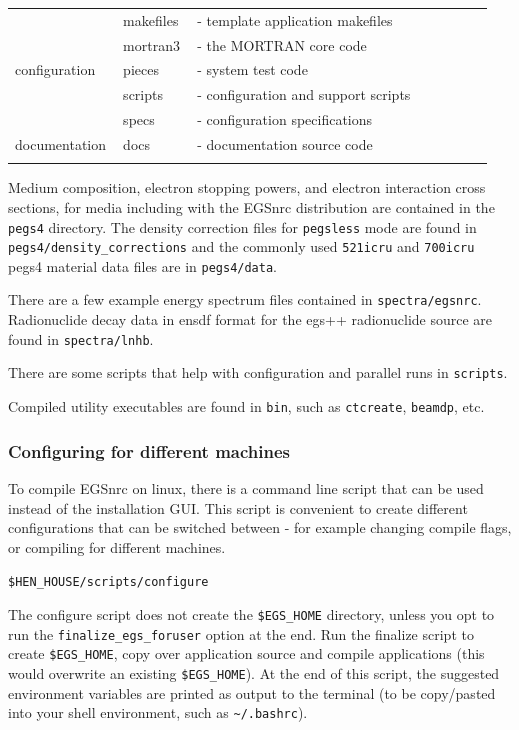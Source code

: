 \documentclass[12pt,twoside]{article}
\begin{document}
\begin{table}[H]
\begin{center}
\begin{tabular}{|p{0.2\linewidth}|p{0.15\linewidth}|p{0.6\linewidth}|}
\multirow{5}{*}{configuration} & makefiles & - template application makefiles \\ \hhline{|~|-|-|}
    & mortran3 & - the MORTRAN core code \\ \hhline{|~|-|-|}
    & pieces & - system test code \\ \hhline{|~|-|-|}
    & scripts & - configuration and support scripts \\ \hhline{|~|-|-|}
    & specs & - configuration specifications \\ \hhline{|===|}

documentation & docs & - documentation source code \\ \hhline{|===|}


\end{tabular}
\end{center}
\end{table}

Medium composition, electron stopping powers, and electron interaction cross sections, for media including with the EGSnrc distribution are contained in the \Verb+pegs4+ directory. The density correction files for \Verb+pegsless+ mode are found in \Verb+pegs4/density_corrections+ and the commonly used \Verb+521icru+ and \Verb+700icru+ pegs4 material data files are in \Verb+pegs4/data+.

There are a few example energy spectrum files contained in \Verb+spectra/egsnrc+. Radionuclide decay data in ensdf format for the egs++ radionuclide source are found in \Verb+spectra/lnhb+.

There are some scripts that help with configuration and parallel runs in \Verb+scripts+.

Compiled utility executables are found in \Verb+bin+, such as \Verb+ctcreate+, \Verb+beamdp+, etc.

\subsubsection{Configuring for different machines}

To compile EGSnrc on linux, there is a command line script that can be used instead of the installation GUI. This script is convenient to create different configurations that can be switched between - for example changing compile flags, or compiling for different machines.

\Verb+$HEN_HOUSE/scripts/configure+

The configure script does not create the \Verb+$EGS_HOME+ directory, unless you opt to run the \Verb+finalize_egs_foruser+ option at the end. Run the finalize script to create \Verb+$EGS_HOME+, copy over application source and compile applications (this would overwrite an existing \Verb+$EGS_HOME+). At the end of this script, the suggested environment variables are printed as output to the terminal (to be copy/pasted into your shell environment, such as \Verb+~/.bashrc+).
\end{document}
